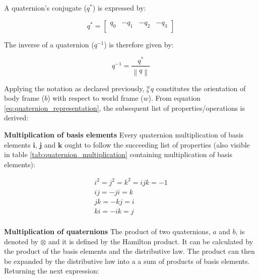 A quaternion's conjugate ($q^{\ast} $) is expressed by:

\begin{equation}
    q^{\ast}  =\begin{bmatrix}
        q_0 & -q_1 & -q_2 & -q_3 \\
    \end{bmatrix}
\end{equation}

The inverse of a quaternion (${q^{-1}}$) is therefore given by:

\begin{equation}
    q^{-1} = \frac{q^{\ast} }{\left\lVert q \right\rVert }
\end{equation}

Applying the notation as declared previously, ${^w_b}q$ constitutes the orientation of body frame ($b$) with respect to world frame ($w$). From equation \ref{eq:quaternion_representation}, the subsequent list of properties/operations is derived:

\item \textbf{Multiplication of basis elements} Every quaternion multiplication of basis elements $\boldsymbol{i}$, $\boldsymbol{j}$ and $\boldsymbol{k}$ ought to follow the succeeding list of properties (also visible in table \ref{tab:quaternion_multiplication} containing multiplication of basis elements):


\begin{equation}
    \begin{gathered}
        i^2=j^2=k^2=ijk=-1 \\
        ij = -ji = k       \\
        jk = -kj = i       \\
        ki = -ik = j       \\
    \end{gathered}
    \label{eq:quaternion_rules}
\end{equation}



\item \textbf{Multiplication of quaternions} The product of two quaternions, $a$ and $b$, is denoted by $\otimes$ and it is defined by the Hamilton product. It can be calculated by the product of the basis elements and the distributive law. The product can then be expanded by the distributive law into a a sum of products of basis elements. Returning the next expression:


